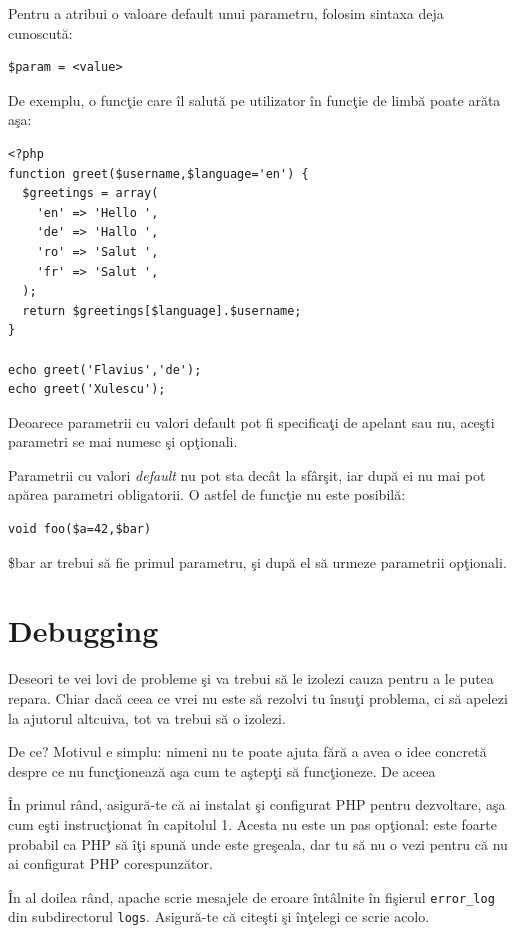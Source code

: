 Pentru a atribui o valoare default unui parametru, folosim sintaxa deja
cunoscută:
\begin{verbatim}
$param = <value>
\end{verbatim}

De exemplu, o funcţie care îl salută pe utilizator în funcţie de limbă
poate arăta aşa:

\begin{lstlisting}
<?php
function greet($username,$language='en') {
  $greetings = array(
	'en' => 'Hello ',
	'de' => 'Hallo ',
	'ro' => 'Salut ',
	'fr' => 'Salut ',
  );
  return $greetings[$language].$username;
}

echo greet('Flavius','de');
echo greet('Xulescu');
\end{lstlisting}
Deoarece parametrii cu valori default pot fi specificaţi de
apelant sau nu, aceşti parametri se mai numesc şi opţionali.

Parametrii cu valori \textit{default} nu pot sta decât
la sfârşit, iar după ei nu mai pot
apărea parametri obligatorii. O astfel de funcţie nu este posibilă:
\begin{verbatim}
void foo($a=42,$bar)
\end{verbatim}
\$bar ar trebui să fie primul parametru, şi după el să urmeze parametrii opţionali.

\section{Debugging}
Deseori te vei lovi de probleme şi va trebui să le izolezi cauza
pentru a le putea repara. Chiar dacă ceea ce vrei nu este să
rezolvi tu însuţi problema, ci să apelezi la ajutorul altcuiva,
tot va trebui să o izolezi.

De ce? Motivul e simplu: nimeni nu te poate ajuta fără
a avea o idee concretă despre ce nu funcţionează aşa cum te
aştepţi să funcţioneze. De aceea


În primul rând, asigură-te că ai instalat şi configurat PHP
pentru dezvoltare, aşa cum eşti instrucţionat în capitolul 1.
Acesta nu este un pas opţional: este foarte probabil ca PHP
să îţi spună unde este greşeala, dar tu să nu o vezi pentru
că nu ai configurat PHP corespunzător.

În al doilea rând, apache scrie mesajele de eroare întâlnite
în fişierul \texttt{error\_log} din subdirectorul \texttt{logs}.
Asigură-te că citeşti şi înţelegi ce scrie acolo.

